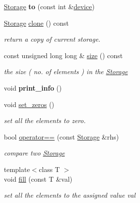 \begin{DoxyCompactItemize}
\item 
\mbox{\label{classcytnx_1_1Storage_a2abfcaacf807934be5dd21c254fdb30e}} 
\hyperlink{classcytnx_1_1Storage}{Storage} {\bfseries to} (const int \&\hyperlink{classcytnx_1_1Storage_a4c3e27582d7f951e6b76ccbb92f7c537}{device})
\item 
\hyperlink{classcytnx_1_1Storage}{Storage} \hyperlink{classcytnx_1_1Storage_aed0530dd20f3fb352d45653ba46a3d50}{clone} () const
\begin{DoxyCompactList}\small\item\em return a copy of current storage. \end{DoxyCompactList}\item 
const unsigned long long \& \hyperlink{classcytnx_1_1Storage_aaf36262622abdab03c90b713c454f78e}{size} () const
\begin{DoxyCompactList}\small\item\em the size ( no. of elements ) in the \hyperlink{classcytnx_1_1Storage}{Storage} \end{DoxyCompactList}\item 
\mbox{\label{classcytnx_1_1Storage_a0ae2bee5e15c651b05dadf5dbbdb36f5}} 
void {\bfseries print\+\_\+info} ()
\item 
void \hyperlink{classcytnx_1_1Storage_a7e854529c99108b0acc3e5e2b185244b}{set\+\_\+zeros} ()
\begin{DoxyCompactList}\small\item\em set all the elements to zero. \end{DoxyCompactList}\item 
bool \hyperlink{classcytnx_1_1Storage_ad304e00cf3d472ea0355af6b40c4529d}{operator==} (const \hyperlink{classcytnx_1_1Storage}{Storage} \&rhs)
\begin{DoxyCompactList}\small\item\em compare two \hyperlink{classcytnx_1_1Storage}{Storage} \end{DoxyCompactList}\item 
{\footnotesize template$<$class T $>$ }\\void \hyperlink{classcytnx_1_1Storage_a48f0424f051a4b3a821eb964be4cd5db}{fill} (const T \&val)
\begin{DoxyCompactList}\small\item\em set all the elements to the assigned value val \end{DoxyCompactList}\end{DoxyCompactItemize}


